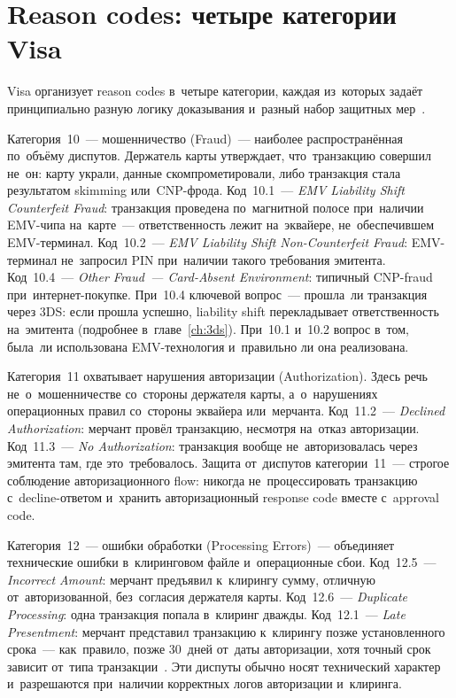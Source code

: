 \section{Reason codes: четыре категории Visa}
\label{sec:disputes-reason-codes}

Visa организует reason codes в~четыре категории, каждая из~которых
задаёт принципиально разную логику доказывания и~разный набор защитных
мер~.

Категория~10~--- мошенничество (Fraud)~--- наиболее распространённая
по~объёму диспутов. Держатель карты утверждает, что~транзакцию
совершил не~он: карту украли, данные скомпрометировали, либо транзакция
стала результатом skimming или~CNP-фрода. Код~10.1~---
\textit{EMV Liability Shift Counterfeit Fraud}: транзакция проведена по~магнитной
полосе при~наличии EMV-чипа на~карте~--- ответственность лежит на~эквайере,
не~обеспечившем EMV-терминал. Код~10.2~--- \textit{EMV Liability Shift
  Non-Counterfeit Fraud}: EMV-терминал не~запросил PIN при~наличии такого
требования эмитента. Код~10.4~--- \textit{Other Fraud~--- Card-Absent
  Environment}: типичный CNP-fraud при~интернет-покупке. При~10.4 ключевой
вопрос~--- прошла~ли транзакция через 3DS: если прошла успешно, liability
shift перекладывает ответственность на~эмитента (подробнее в~главе~\ref{ch:3ds}).
При~10.1 и~10.2 вопрос в~том, была~ли использована EMV-технология и~правильно
ли она реализована.

Категория~11 охватывает нарушения авторизации (Authorization). Здесь речь
не~о~мошенничестве со~стороны держателя карты, а~о~нарушениях операционных
правил со~стороны эквайера или~мерчанта. Код~11.2~---
\textit{Declined Authorization}: мерчант провёл транзакцию, несмотря на~отказ
авторизации. Код~11.3~--- \textit{No Authorization}: транзакция вообще
не~авторизовалась через эмитента там, где это~требовалось. Защита от~диспутов
категории~11~--- строгое соблюдение авторизационного flow: никогда не~процессировать
транзакцию с~decline-ответом и~хранить авторизационный response code вместе
с~approval code.

Категория~12~--- ошибки обработки (Processing Errors)~--- объединяет
технические ошибки в~клиринговом файле
и~операционные сбои. Код~12.5~--- \textit{Incorrect Amount}: мерчант
предъявил к~клирингу сумму, отличную от~авторизованной, без~согласия
держателя карты. Код~12.6~--- \textit{Duplicate Processing}: одна транзакция
попала в~клиринг дважды. Код~12.1~--- \textit{Late Presentment}: мерчант
представил транзакцию к~клирингу позже установленного срока~--- как~правило,
позже 30~дней от~даты авторизации, хотя точный срок зависит от~типа
транзакции~. Эти диспуты обычно носят
технический характер и~разрешаются при~наличии корректных логов
авторизации и~клиринга.

